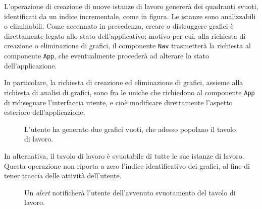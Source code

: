 \vspace{3mm}

L'operazione di creazione di nuove istanze di lavoro genererà dei quadranti svuoti, identificati da un indice incrementale, come in figura. Le istanze sono analizzabili o eliminabili. Come accennato in precedenza, creare o distruggere grafici è direttamente legato allo stato dell'applicativo; motivo per cui, alla richiesta di creazione o eliminazione di grafici, il componente \verb|Nav| trasmetterà la richiesta al componente \verb|App|, che eventualmente procederà ad alterare lo stato dell'applicazione. 

In particolare, la richiesta di creazione ed eliminazione di grafici, assieme alla richiesta di analisi di grafici, sono fra le uniche che richiedono al componente \verb|App| di ridisegnare l'interfaccia utente, e cioè modificare direttamente l'aspetto esteriore dell'applicazione.

\begin{figure}[ht!]
    \centering
    \caption{L'utente ha generato due grafici vuoti, che adesso popolano il tavolo di lavoro.}
    \label{fig:esempio}
\end{figure}

In alternativa, il tavolo di lavoro è svuotabile di tutte le sue istanze di lavoro. Questa operazione non riporta a zero l'indice identificativo dei grafici, al fine di tener traccia delle attività dell'utente.

\begin{figure}[ht!]
    \centering
    \caption{Un \textit{alert} notificherà l'utente dell'avvenuto svuotamento del tavolo di lavoro.}
    \label{fig:esempio}
\end{figure}

